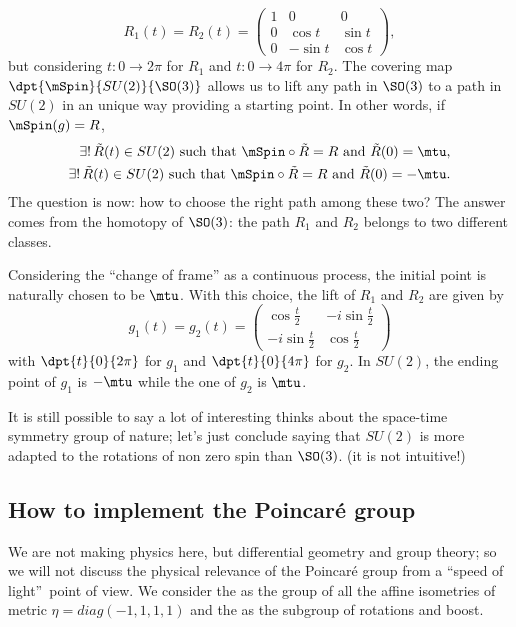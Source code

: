 \[
	R_1(t)=R_2(t)=
	\begin{pmatrix}
		1 & 0       & 0      \\
		0 & \cos t  & \sin t \\
		0 & -\sin t & \cos t
	\end{pmatrix},
\]
but considering $t\colon 0\to 2\pi$ for $R_1$ and $t\colon 0\to 4\pi$ for $R_2$. The covering map $\dpt{\mSpin}{SU(2)}{\SO(3)}$ allows us to lift any path in $\SO(3)$ to a path in $SU(2)$ in an unique way providing a starting point. In other words, if $\mSpin(g)=R$,
\[
	\begin{split}
		\exists !\, \tilde{R}(t)\in SU(2)\text{ such that }\mSpin\circ\tilde{R}=R \text{ and } \tilde{R}(0)=\mtu,\\
		\exists !\, \tilde{R}(t)\in SU(2)\text{ such that }\mSpin\circ\tilde{R}=R \text{ and } \tilde{R}(0)=-\mtu.
	\end{split}
\]
The question is now: how to choose the right path among these two? The answer comes from the homotopy of $\SO(3)$: the path $R_1$ and $R_2$ belongs to two different classes.

Considering the ``change of frame''{} as a continuous process, the initial point is naturally chosen to be $\mtu$. With this choice, the lift of $R_1$ and $R_2$ are given by
\[
	g_1(t)=g_2(t)=
	\begin{pmatrix}
		\cos\frac{t}{2}   & -i\sin\frac{t}{2} \\
		-i\sin\frac{t}{2} & \cos \frac{t}{2}
	\end{pmatrix}
\]
with $\dpt{t}{0}{2\pi}$ for $g_1$ and $\dpt{t}{0}{4\pi}$ for $g_2$. In $SU(2)$, the ending point of $g_1$ is $-\mtu$ while the one of $g_2$ is $\mtu$.

It is still possible to say a lot of interesting thinks about the space-time symmetry group of nature; let's just conclude saying that $SU(2)$ is more adapted to the rotations of non zero spin than $\SO(3)$. (it is  not intuitive!)
\subsection{How to implement the Poincaré group}
\label{pg:poincare_act}

We are not making physics here, but differential geometry and group theory; so we will not discuss the physical relevance of the Poincaré group from a ``speed of light''\ point of view. We consider the  as the group of all the affine isometries of metric $\eta=diag(-1,1,1,1)$ and the  as the subgroup of rotations and boost.

